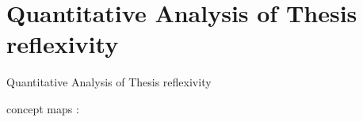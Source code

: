 

\chapter{Quantitative Analysis of Thesis reflexivity}{Quantitative Analysis of Thesis reflexivity} %

\label{app:reflexivity} %









concept maps : \cite{novak2008theory}



